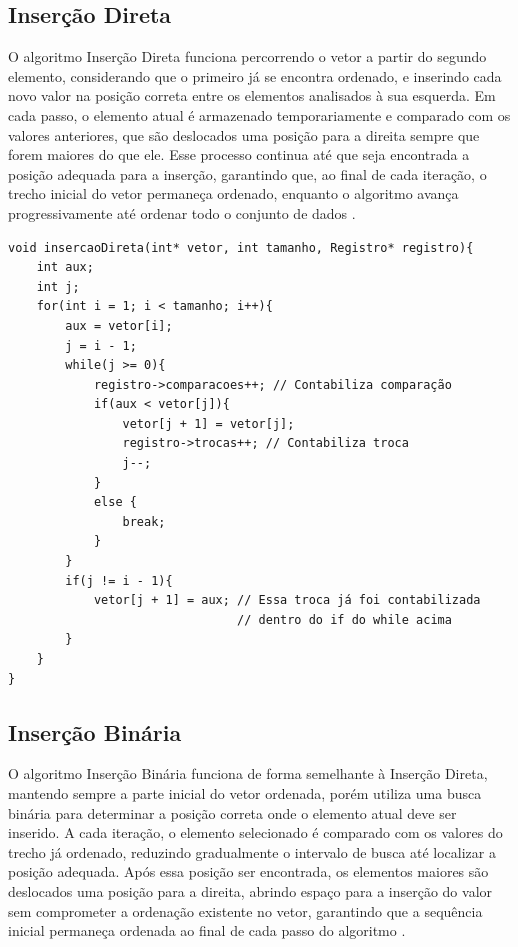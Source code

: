 \documentclass[12pt]{article}
\begin{document}
\subsection{Inserção Direta}

O algoritmo Inserção Direta funciona percorrendo o vetor a partir do segundo elemento, considerando que o primeiro já se encontra ordenado, e inserindo cada novo valor na posição correta entre os elementos analisados à sua esquerda. Em cada passo, o elemento atual é armazenado temporariamente e comparado com os valores anteriores, que são deslocados uma posição para a direita sempre que forem maiores do que ele. Esse processo continua até que seja encontrada a posição adequada para a inserção, garantindo que, ao final de cada iteração, o trecho inicial do vetor permaneça ordenado, enquanto o algoritmo avança progressivamente até ordenar todo o conjunto de dados \cite{ziviani2012}.

\newpage

\begin{lstlisting}
void insercaoDireta(int* vetor, int tamanho, Registro* registro){
    int aux;
    int j;
    for(int i = 1; i < tamanho; i++){
        aux = vetor[i];
        j = i - 1;
        while(j >= 0){
            registro->comparacoes++; // Contabiliza comparação
            if(aux < vetor[j]){
                vetor[j + 1] = vetor[j];
                registro->trocas++; // Contabiliza troca
                j--;
            } 
            else {
                break;
            }		
        }
        if(j != i - 1){
            vetor[j + 1] = aux; // Essa troca já foi contabilizada 
                                // dentro do if do while acima
        }
    }
}
\end{lstlisting}

\subsection{Inserção Binária}

O algoritmo Inserção Binária funciona de forma semelhante à Inserção Direta, mantendo sempre a parte inicial do vetor ordenada, porém utiliza uma busca binária para determinar a posição correta onde o elemento atual deve ser inserido. A cada iteração, o elemento selecionado é comparado com os valores do trecho já ordenado, reduzindo gradualmente o intervalo de busca até localizar a posição adequada. Após essa posição ser encontrada, os elementos maiores são deslocados uma posição para a direita, abrindo espaço para a inserção do valor sem comprometer a ordenação existente no vetor, garantindo que a sequência inicial permaneça ordenada ao final de cada passo do algoritmo \cite{cormen2009}.
\end{document}
